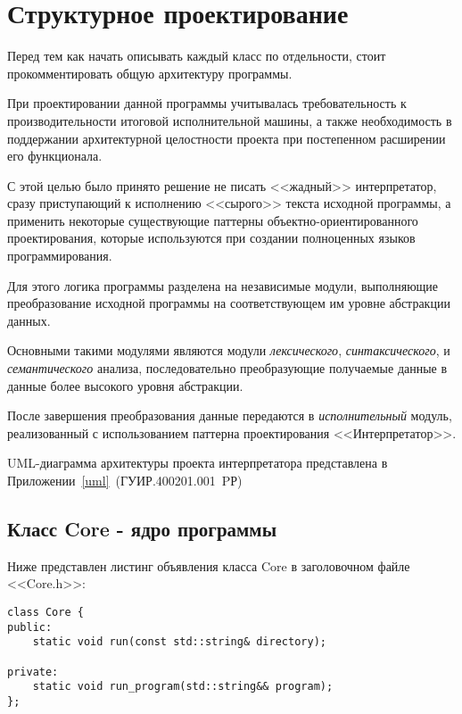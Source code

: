 \section{Структурное проектирование}

\label{class-description}

Перед тем как начать описывать каждый класс по отдельности, стоит прокомментировать
общую архитектуру программы. 

При проектировании данной программы учитывалась требовательность к производительности
итоговой исполнительной машины, а также необходимость в поддержании архитектурной 
целостности проекта при постепенном расширении его функционала.

С этой целью было принято решение не писать <<жадный>> интерпретатор, сразу приступающий
к исполнению <<сырого>> текста исходной программы, а применить некоторые существующие
паттерны объектно-ориентированного проектирования, 
которые используются при создании полноценных языков программирования.

Для этого логика программы разделена на независимые модули, выполняющие преобразование
исходной программы на соответствующем им уровне абстракции данных.

Основными такими модулями являются модули \emph{лексического}, \emph{синтаксического},
и \emph{семантического} анализа, последовательно преобразующие
получаемые данные в данные более высокого уровня абстракции.

После завершения преобразования данные передаются в \emph{исполнительный} модуль,
реализованный с использованием паттерна проектирования <<Интерпретатор>>.

UML-диаграмма архитектуры проекта интерпретатора
представлена в \mbox{Приложении \ref{uml} (ГУИР.400201.001 PР)}

\subsection{Класс Core - ядро программы}

Ниже представлен листинг объявления класса Core
в заголовочном файле <<Core.h>>:

\begin{verbatim}
class Core {
public:
    static void run(const std::string& directory);

private:
    static void run_program(std::string&& program);
};
\end{verbatim}

